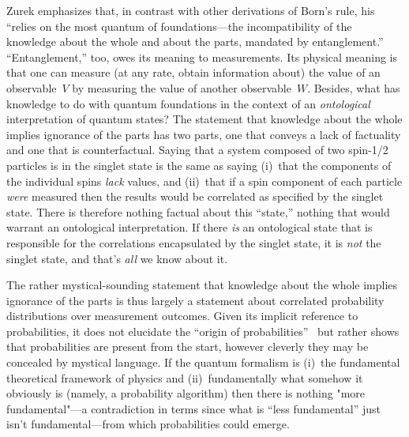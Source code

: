 \documentclass[12pt]{article}
\begin{document}
Zurek emphasizes that, in contrast with other derivations of Born's rule, his 
``relies on the most quantum of foundations---the incompatibility of the 
knowledge about the whole and about the parts, mandated by entanglement.'' 
``Entanglement,'' too, owes its meaning to measurements. Its physical meaning 
is that one can measure (at any rate, obtain information about) the value of an 
observable~$V$ by measuring the value of another observable~$W$. Besides, 
what has knowledge to do with quantum foundations in the context of an {\it 
ontological\/} interpretation of quantum states? The statement that knowledge 
about the whole implies ignorance of the parts has two parts, one that conveys a 
lack of factuality and one that is counterfactual. Saying that a system composed 
of two spin-1/2 particles is in the singlet state is the same as saying (i)~that the 
components of the individual spins {\it lack\/} values, and (ii)~that if a spin 
component of each particle {\it were\/} measured then the results would be 
correlated as specified by the singlet state. There is therefore nothing factual 
about this ``state,'' nothing that would warrant an ontological interpretation. If 
there {\it is\/} an ontological state that is responsible for the correlations 
encapsulated by the singlet state, it is {\it not\/} the singlet state, and that's 
{\it all\/} we know about it.

The rather mystical-sounding statement that knowledge about the whole implies 
ignorance of the parts is thus largely a statement about correlated probability 
distributions over measurement outcomes. Given its implicit reference to 
probabilities, it does not elucidate the ``origin of 
probabilities''~\cite{ZurekRMP} but rather shows that probabilities are present 
from the start, however cleverly they may be concealed by mystical language. If 
the quantum formalism is (i)~the fundamental theoretical framework of physics 
and (ii)~fundamentally what somehow it obviously is (namely, a probability 
algorithm) then there is nothing "more fundamental"---a contradiction in terms 
since what is ``less fundamental'' just isn't fundamental---from which 
probabilities could emerge.
\end{document}
